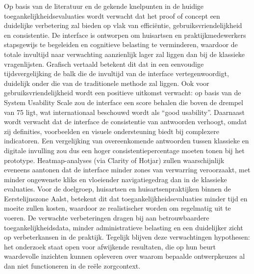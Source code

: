 Op basis van de literatuur en de gekende knelpunten in de huidige toegankelijkheidsevaluaties wordt verwacht dat het proof of concept een duidelijke verbetering zal bieden op vlak van efficiëntie, gebruiksvriendelijkheid en consistentie.
De interface is ontworpen om huisartsen en praktijkmedewerkers stapsgewijs te begeleiden en cognitieve belasting te verminderen, waardoor de totale invultijd naar verwachting aanzienlijk lager zal liggen dan bij de klassieke vragenlijsten.
Grafisch vertaald betekent dit dat in een eenvoudige tijdsvergelijking de balk die de invultijd van de interface vertegenwoordigt, duidelijk onder die van de traditionele methode zal liggen.
Ook voor gebruiksvriendelijkheid wordt een positieve uitkomst verwacht: op basis van de System Usability Scale zou de interface een score behalen die boven de drempel van 75 ligt, wat internationaal beschouwd wordt als “good usability”.
Daarnaast wordt verwacht dat de interface de consistentie van antwoorden verhoogt, omdat zij definities, voorbeelden en visuele ondersteuning biedt bij complexere indicatoren.
Een vergelijking van overeenkomende antwoorden tussen klassieke en digitale invulling zou dus een hoger consistentiepercentage moeten tonen bij het prototype. Heatmap-analyses (via Clarity of Hotjar) zullen waarschijnlijk eveneens aantonen dat de interface minder zones van verwarring veroorzaakt, met minder ongewenste kliks en vloeiender navigatiegedrag dan in de klassieke evaluaties.
Voor de doelgroep, huisartsen en huisartsenpraktijken binnen de Eerstelijnszone Aalst, betekent dit dat toegankelijkheidsevaluaties minder tijd en moeite zullen kosten, waardoor ze realistischer worden om regelmatig uit te voeren.
De verwachte verbeteringen dragen bij aan betrouwbaardere toegankelijkheidsdata, minder administratieve belasting en een duidelijker zicht op verbeterkansen in de praktijk.
Tegelijk blijven deze verwachtingen hypothesen: het onderzoek staat open voor afwijkende resultaten, die op hun beurt waardevolle inzichten kunnen opleveren over waarom bepaalde ontwerpkeuzes al dan niet functioneren in de reële zorgcontext.
